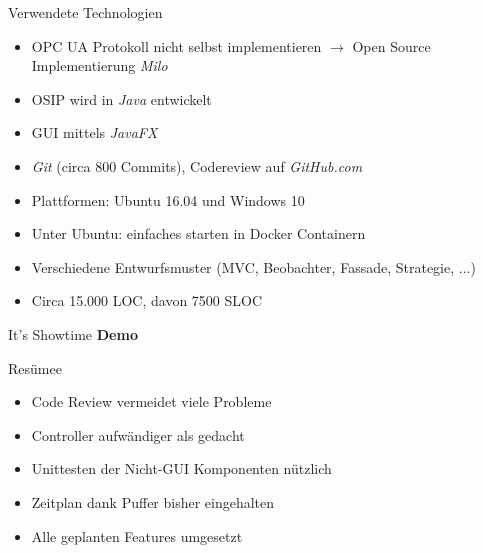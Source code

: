 \documentclass[22pt]{beamer}
\begin{document}
\begin{frame}{Verwendete Technologien}
\begin{itemize}[<+->]
 \item OPC UA Protokoll nicht selbst implementieren $\rightarrow$ Open Source Implementierung \emph{Milo}
 \item OSIP wird in \emph{Java} entwickelt
 \item GUI mittels \emph{JavaFX}
 \item \emph{Git} (circa 800 Commits), Codereview auf \emph{GitHub.com}
 \item Plattformen: Ubuntu 16.04 und Windows 10
 \item Unter Ubuntu: einfaches starten in Docker Containern
 \item Verschiedene Entwurfsmuster (MVC, Beobachter, Fassade, Strategie, ...)
 \item Circa 15.000 LOC, davon 7500 SLOC
\end{itemize}
\end{frame}

\begin{frame}{It's Showtime}
\centering
\huge
\textbf{Demo}
\end{frame}

\begin{frame}{Resümee}
\begin{itemize}[<+->]
 \item Code Review vermeidet viele Probleme
 \item Controller aufwändiger als gedacht
 \item Unittesten der Nicht-GUI Komponenten nützlich
 \item Zeitplan dank Puffer bisher eingehalten
 \item Alle geplanten Features umgesetzt
\end{itemize}
\end{frame}
\end{document}
